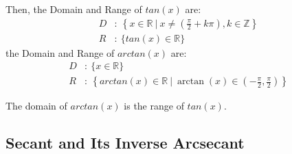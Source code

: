 \documentclass[12pt, titlepage]{article}
\begin{document}
        Then, the Domain and Range of $\displaystyle tan( x)$ are:
            \begin{align*}
                D&:\ \left\{x\in \mathbb{R}\:|\:x\neq \left(\frac{\pi }{2} +k\pi \right) ,k\in \mathbb{Z}\right\}\\
                R&:\ \{tan(x)\in \mathbb{R} \}
            \end{align*}
        the Domain and Range of $\displaystyle arctan( x)$ are:
            \begin{align*}
                D&:\ \{x\in \mathbb{R}\}\\
                R&:\ \left\{arctan(x)\in \mathbb{R}\:|\:\arctan(x)\in \left( -\frac{\pi }{2} ,\frac{\pi }{2}\right)\right\}
            \end{align*}

        The domain of $arctan(x)$ is the range of $tan(x)$.
    
    
    \subsection{Secant and Its Inverse Arcsecant}
\end{document}

